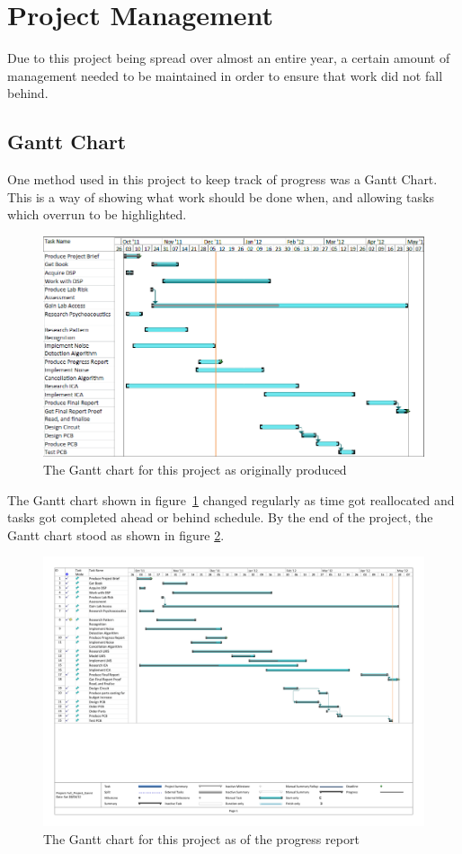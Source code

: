 \section{Project Management}
Due to this project being spread over almost an entire year, a certain amount of management needed to be maintained in order to ensure that work did not fall behind.

\subsection{Gantt Chart}
One method used in this project to keep track of progress was a Gantt Chart.
This is a way of showing what work should be done when, and allowing tasks which overrun to be highlighted.
\\
\begin{figure}
	\centering
	\includegraphics[width=\textwidth]{./img/ganntori.png}
	\caption{The Gantt chart for this project as originally produced}
	\label{fig:gannt}
\end{figure}

\noindent
The Gantt chart shown in figure~\ref{fig:gannt} changed regularly as time got reallocated and tasks got completed ahead or behind schedule.
By the end of the project, the Gantt chart stood as shown in figure \ref{fig:newgannt}.
\\
\begin{figure}
	\centering
	\includegraphics[width=\textwidth]{./img/Full_Project_Gannt_final.pdf}
	\caption{The Gantt chart for this project as of the progress report}
	\label{fig:newgannt}
\end{figure}

